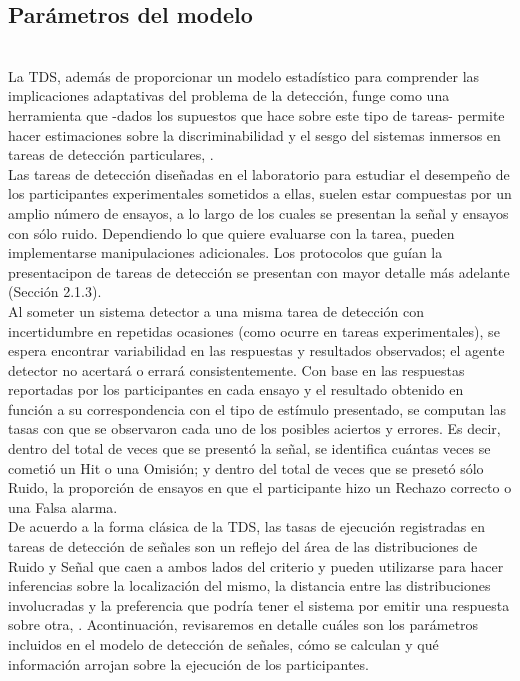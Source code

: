 \subsection{Parámetros del modelo}\\

La TDS, además de proporcionar un modelo estadístico para comprender las implicaciones adaptativas del problema de la detección, funge como una herramienta que -dados los supuestos que hace sobre este tipo de tareas- permite hacer estimaciones sobre la discriminabilidad y el sesgo del sistemas inmersos en tareas de detección particulares, \parencite{Stainslaw1999, McNicol1}.\\

Las tareas de detección diseñadas en el laboratorio para estudiar el desempeño de los participantes experimentales sometidos a ellas, suelen estar compuestas por un amplio número de ensayos, a lo largo de los cuales se presentan la señal y ensayos con sólo ruido. Dependiendo lo que quiere evaluarse con la tarea, pueden implementarse manipulaciones adicionales. Los protocolos que guían la presentacipon de tareas de detección se presentan con mayor detalle más adelante (Sección 2.1.3).\\

Al someter un sistema detector a una misma tarea de detección con incertidumbre en repetidas ocasiones (como ocurre en tareas experimentales), se espera encontrar variabilidad en las respuestas y resultados observados; el agente detector no acertará o errará consistentemente. Con base en las respuestas reportadas por los participantes en cada ensayo y el resultado obtenido en función a su correspondencia con el tipo de estímulo presentado, se computan las tasas con que se observaron cada uno de los posibles aciertos y errores. Es decir, dentro del total de veces que se presentó la señal, se identifica cuántas veces se cometió un Hit o una Omisión; y dentro del total de veces que se presetó sólo Ruido, la proporción de ensayos en que el participante hizo un Rechazo correcto o una Falsa alarma.\\

De acuerdo a la forma clásica de la TDS, las tasas de ejecución registradas en tareas de detección de señales son un reflejo del área de las distribuciones de Ruido y Señal que caen a ambos lados del criterio y pueden utilizarse para hacer inferencias sobre la localización del mismo, la distancia entre las distribuciones involucradas y la preferencia que podría tener el sistema por emitir una respuesta sobre otra, \parencite{Wickens, McNicol1, Gescheider, Stainslaw1999}. Acontinuación, revisaremos en detalle cuáles son los parámetros incluidos en el modelo de detección de señales, cómo se calculan y qué información arrojan sobre la ejecución de los participantes.\\

